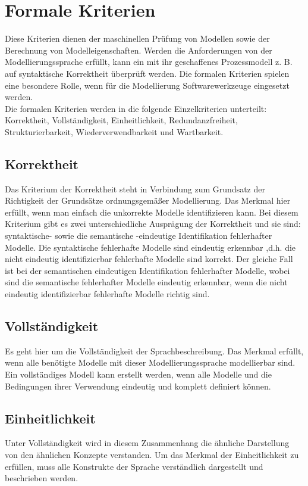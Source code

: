\section{Formale Kriterien}  

Diese Kriterien dienen der maschinellen Prüfung von Modellen sowie der Berechnung von Modelleigenschaften. Werden die Anforderungen von der Modellierungssprache erfüllt, kann ein mit ihr geschaffenes Prozessmodell z. B. auf syntaktische Korrektheit überprüft werden. Die formalen Kriterien spielen eine besondere Rolle, wenn für die Modellierung Softwarewerkzeuge eingesetzt werden\cite{MT007}.\\
Die formalen Kriterien werden in die folgende Einzelkriterien unterteilt:  Korrektheit, Vollständigkeit, Einheitlichkeit, Redundanzfreiheit, Strukturierbarkeit, Wiederverwendbarkeit und Wartbarkeit.
\subsection{Korrektheit}
\label{ssc:Korrektheit}
Das Kriterium der Korrektheit steht in Verbindung zum Grundsatz der Richtigkeit der Grundsätze ordnungsgemäßer Modellierung.
Das Merkmal hier erfüllt, wenn man einfach die unkorrekte Modelle identifizieren kann.
Bei diesem Kriterium gibt es zwei unterschiedliche Ausprägung der Korrektheit und sie sind: syntaktische- sowie die semantische -eindeutige Identifikation fehlerhafter Modelle. 
Die syntaktische fehlerhafte Modelle sind eindeutig erkennbar ,d.h. die nicht eindeutig identifizierbar fehlerhafte Modelle sind korrekt. Der gleiche Fall ist bei der semantischen eindeutigen Identifikation fehlerhafter Modelle, wobei sind die semantische fehlerhafter Modelle eindeutig erkennbar, wenn die nicht eindeutig identifizierbar fehlerhafte Modelle richtig sind.
\subsection{Vollständigkeit}
\label{ssc:Vollständigkeit}
Es geht hier um die Vollständigkeit der Sprachbeschreibung. Das Merkmal erfüllt, wenn alle benötigte Modelle mit dieser Modellierungssprache modellierbar sind.
Ein vollständiges Modell kann erstellt werden, wenn alle Modelle und die Bedingungen ihrer Verwendung eindeutig und komplett definiert können.
\subsection{Einheitlichkeit}
\label{ssc:Einheitlichkeit}
Unter Vollständigkeit wird in diesem Zusammenhang die ähnliche Darstellung von den ähnlichen Konzepte verstanden.
Um das Merkmal der Einheitlichkeit zu erfüllen, muss alle Konstrukte der Sprache verständlich dargestellt und beschrieben werden.
